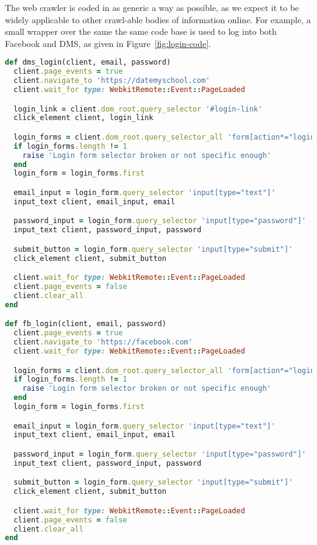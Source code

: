 The web crawler is coded in as generic a way as possible, as we expect it to be widely applicable to other crawl-able bodies of information online.
For example, a small wrapper over the same the same code base is used to log into both Facebook and DMS, as given in Figure~\ref{fig:login-code}.

\begin{figure*}
\begin{lstlisting}[language=Ruby]
def dms_login(client, email, password)
  client.page_events = true
  client.navigate_to 'https://datemyschool.com'
  client.wait_for type: WebkitRemote::Event::PageLoaded

  login_link = client.dom_root.query_selector '#login-link'
  click_element client, login_link

  login_forms = client.dom_root.query_selector_all 'form[action*="login"]'
  if login_forms.length != 1
    raise 'Login form selector broken or not specific enough'
  end
  login_form = login_forms.first

  email_input = login_form.query_selector 'input[type="text"]'
  input_text client, email_input, email

  password_input = login_form.query_selector 'input[type="password"]'
  input_text client, password_input, password

  submit_button = login_form.query_selector 'input[type="submit"]'
  click_element client, submit_button

  client.wait_for type: WebkitRemote::Event::PageLoaded
  client.page_events = false
  client.clear_all
end

def fb_login(client, email, password)
  client.page_events = true
  client.navigate_to 'https://facebook.com'
  client.wait_for type: WebkitRemote::Event::PageLoaded

  login_forms = client.dom_root.query_selector_all 'form[action*="login"]'
  if login_forms.length != 1
    raise 'Login form selector broken or not specific enough'
  end
  login_form = login_forms.first

  email_input = login_form.query_selector 'input[type="text"]'
  input_text client, email_input, email

  password_input = login_form.query_selector 'input[type="password"]'
  input_text client, password_input, password

  submit_button = login_form.query_selector 'input[type="submit"]'
  click_element client, submit_button

  client.wait_for type: WebkitRemote::Event::PageLoaded
  client.page_events = false
  client.clear_all
end
\end{lstlisting}
\caption{Crawler login code for DMS and Facebook.}
\label{fig:login-code}
\end{figure*}

